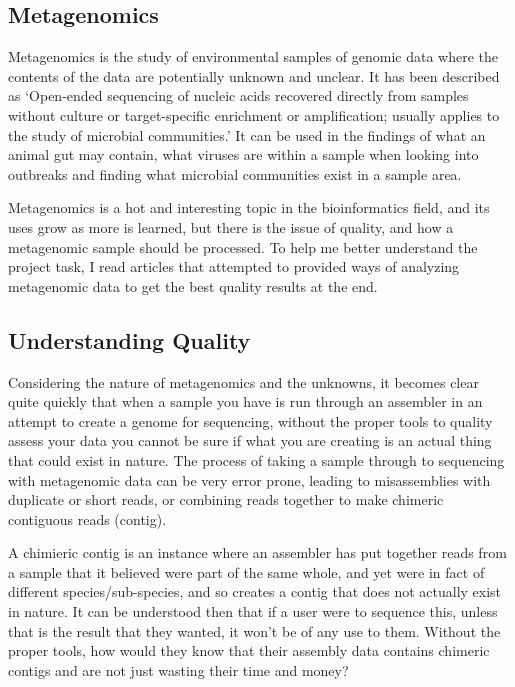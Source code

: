 \subsection{Metagenomics}
Metagenomics is the study of environmental samples of genomic data where the contents of the data are potentially unknown and unclear. It has been described as `Open-ended sequencing of nucleic acids recovered directly from samples without culture or target-specific enrichment or amplification; usually applies to the study of microbial communities.'\cite{citeulike:14021056} It can be used in the findings of what an animal gut may contain, what viruses are within a sample when looking into outbreaks and finding what microbial communities exist in a sample area.

Metagenomics is a hot and interesting topic in the bioinformatics field, and its uses grow as more is learned, but there is the issue of quality, and how a metagenomic sample should be processed. To help me better understand the project task, I read articles that attempted to provided ways of analyzing metagenomic data to get the best quality results at the end.\cite{citeulike:11448654}

\subsection{Understanding Quality}

Considering the nature of metagenomics and the unknowns, it becomes clear quite quickly that when a sample you have is run through an assembler in an attempt to create a genome for sequencing, without the proper tools to quality assess your data you cannot be sure if what you are creating is an actual thing that could exist in nature. The process of taking a sample through to sequencing with metagenomic data can be very error prone, leading to misassemblies with duplicate or short reads, or combining reads together to make chimeric contiguous reads (contig).\cite{citeulike:3746363}

A chimieric contig is an instance where an assembler has put together reads from a sample that it believed were part of the same whole, and yet were in fact of different species/sub-species, and so creates a contig that does not actually exist in nature. It can be understood then that if a user were to sequence this, unless that is the result that they wanted, it won't be of any use to them. Without the proper tools, how would they know that their assembly data contains chimeric contigs and are not just wasting their time and money?

